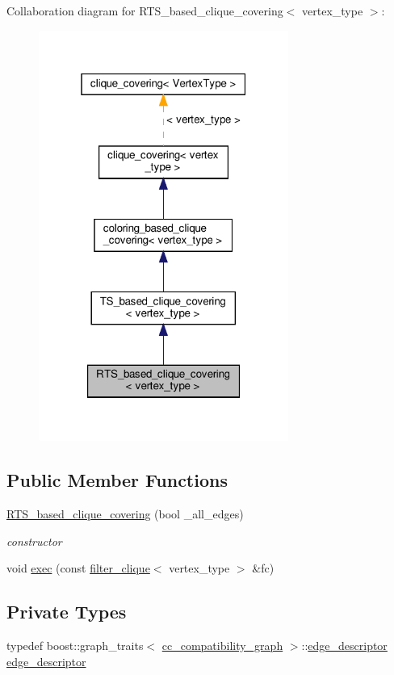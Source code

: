 Collaboration diagram for R\+T\+S\+\_\+based\+\_\+clique\+\_\+covering$<$ vertex\+\_\+type $>$\+:
\nopagebreak
\begin{figure}[H]
\begin{center}
\leavevmode
\includegraphics[width=232pt]{da/dc4/classRTS__based__clique__covering__coll__graph}
\end{center}
\end{figure}
\subsection*{Public Member Functions}
\begin{DoxyCompactItemize}
\item 
\hyperlink{classRTS__based__clique__covering_a81b1751e2e31ec7dab4e12a2dc9990bd}{R\+T\+S\+\_\+based\+\_\+clique\+\_\+covering} (bool \+\_\+all\+\_\+edges)
\begin{DoxyCompactList}\small\item\em constructor \end{DoxyCompactList}\item 
void \hyperlink{classRTS__based__clique__covering_a8420447a440f2eb93a4c2f2eb42fac14}{exec} (const \hyperlink{structfilter__clique}{filter\+\_\+clique}$<$ vertex\+\_\+type $>$ \&fc)
\end{DoxyCompactItemize}
\subsection*{Private Types}
\begin{DoxyCompactItemize}
\item 
typedef boost\+::graph\+\_\+traits$<$ \hyperlink{clique__covering__graph_8hpp_aa88e9419fe776ef37020cacd507cc4ad}{cc\+\_\+compatibility\+\_\+graph} $>$\+::\hyperlink{classTS__based__clique__covering_ab89e23e8ad01980e2ea3ac0d796db907}{edge\+\_\+descriptor} \hyperlink{classRTS__based__clique__covering_ac697cd880202357fe31962b3b45bcb4c}{edge\+\_\+descriptor}
\end{DoxyCompactItemize}
